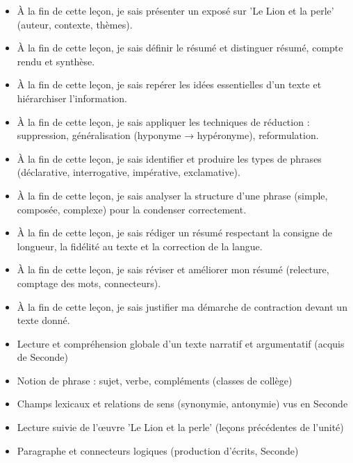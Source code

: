 \documentclass[11pt]{article}
\begin{document}
\begin{objectifs}
\begin{itemize}
\item À la fin de cette leçon, je sais présenter un exposé sur 'Le Lion et la perle' (auteur, contexte, thèmes).
\item À la fin de cette leçon, je sais définir le résumé et distinguer résumé, compte rendu et synthèse.
\item À la fin de cette leçon, je sais repérer les idées essentielles d'un texte et hiérarchiser l'information.
\item À la fin de cette leçon, je sais appliquer les techniques de réduction : suppression, généralisation (hyponyme → hypéronyme), reformulation.
\item À la fin de cette leçon, je sais identifier et produire les types de phrases (déclarative, interrogative, impérative, exclamative).
\item À la fin de cette leçon, je sais analyser la structure d'une phrase (simple, composée, complexe) pour la condenser correctement.
\item À la fin de cette leçon, je sais rédiger un résumé respectant la consigne de longueur, la fidélité au texte et la correction de la langue.
\item À la fin de cette leçon, je sais réviser et améliorer mon résumé (relecture, comptage des mots, connecteurs).
\item À la fin de cette leçon, je sais justifier ma démarche de contraction devant un texte donné.
\end{itemize}
\end{objectifs}

\begin{prerequis}
\begin{itemize}
\item Lecture et compréhension globale d'un texte narratif et argumentatif (acquis de Seconde)
\item Notion de phrase : sujet, verbe, compléments (classes de collège)
\item Champs lexicaux et relations de sens (synonymie, antonymie) vus en Seconde
\item Lecture suivie de l'œuvre 'Le Lion et la perle' (leçons précédentes de l'unité)
\item Paragraphe et connecteurs logiques (production d'écrits, Seconde)
\end{itemize}
\end{prerequis}
\end{document}
